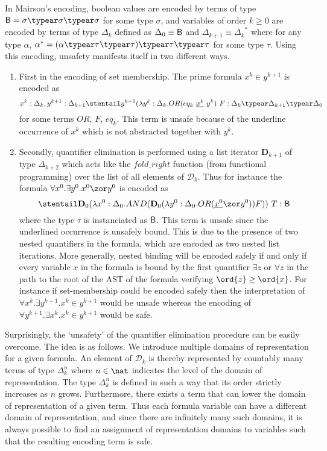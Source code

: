 In Mairson's encoding, boolean values are encoded by terms of type
$\booltype = \sigma \typear \sigma\typear \sigma$ for some type
$\sigma$, and variables of order $k \geq 0$ are encoded by terms of
type $\Delta_k$ defined as $\Delta_0 \equiv \mathsf{B}$ and
$\Delta_{k+1} \equiv {\Delta_k}^*$ where for any type $\alpha$,
$\alpha^* = (\alpha \typear \tau \typear \tau)\typear \tau \typear
\tau$ for some type $\tau$. Using this encoding, unsafety manifests
itself in two different ways.
\begin{enumerate}[1.]
  \item
        First in the encoding of set membership. The prime formula $x^k \in y^{k+1}$ is encoded as \begin{equation} x^k : \Delta_k, y^{k+1}:\Delta_{k+1} \stentail y^{k+1} (\lambda y^k : \Delta_k . OR (eq_k~\underline{x^k}~y^k)~F : \Delta_k \typear \Delta_{k+1} \typear \Delta_0 \label{eqn:setmembership}\end{equation}
for some terms $OR$, $F$, $eq_k$.
This term is unsafe because of the underline occurrence of $x^k$ which is not abstracted together with $y^k$.

\item Secondly, quantifier elimination is performed using a list iterator $\mathbf{D}_{k+1}$ of type $\Delta_{k+2}$ which acts like the $fold\_right$ function (from functional programming) over the list of all elements of $\mathcal{D}_k$.
Thus for instance the formula $\forall x^0 . \exists y^0 . x^0
\zor y^0$ is encoded as $$\stentail \mathbf{D}_0 (\lambda
x^0:\Delta_0. AND (\mathbf{D}_0 (\lambda y^0:\Delta_0. OR
(\underline{x^0} \zor y^0)) F))\ T : \booltype$$ where the type
$\tau$ is instanciated as $\mathsf{B}$. This term is unsafe since
the underlined occurrence is unsafely bound. This is due to the
presence of two nested quantifiers in the formula, which are
encoded as two nested list iterations. More generally, nested
binding will be encoded safely if and only if every variable $x$
in the formula is bound by the first quantifier $\exists z$ or
$\forall z$ in the path to the root of the AST of the formula
verifying $\ord{z} \geq \ord{x}$. For instance if set-membership
could be encoded safely then the interpretation of $\forall x^k
. \exists y^{k+1} . x^k \in y^{k+1}$ would be unsafe whereas the
encoding of $\forall y^{k+1} . \exists x^k . x^k \in y^{k+1}$
would be safe.
\end{enumerate}

Surprisingly, the `unsafety' of the quantifier elimination procedure can be easily overcome. The idea is as follows. We introduce multiple domains of representation for a given formula. An element of $\mathcal{D}_k$ is thereby represented by countably many terms of type $\Delta_k^n$ where $n\in\nat$ indicates the level of the domain of representation. The type $\Delta_k^n$ is defined in such a way that its order strictly increases as $n$ grows. Furthermore, there exists a term that can lower the domain of representation of a given term. Thus each formula variable can have a different domain of representation, and since there are infinitely many such domains, it is always possible to find an assignment of representation domains to variables such that the resulting encoding term is safe.


